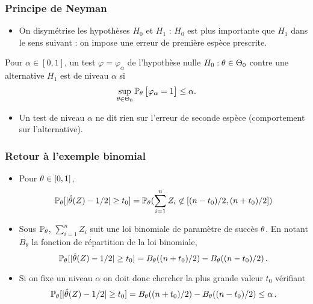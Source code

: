 \begin{frame}
\frametitle{Principe de Neyman}
\begin{itemize}
\item
On  \alert{disymétrise}  les hypothèses $H_0$ et $H_1$
: $H_0$ est  plus importante  que $H_1$ dans le sens suivant : on \alert{ impose} une \alert{erreur de première espèce prescrite}.
\end{itemize}
\begin{df}
Pour $\alpha \in [0,1]$, un test $\varphi = \varphi_\alpha$ de l'hypothèse nulle $H_0:\theta \in \Theta_0$ contre une alternative $H_1$ est de niveau $\alpha$ si
$$\sup_{\theta \in \Theta_0}\operatorname{{\mathbb P}}_\theta\big[\varphi_\alpha = 1\big] \leq \alpha.$$
\end{df}
\begin{itemize}
\item Un test de niveau $\alpha$ ne dit \alert{rien} sur l'erreur de seconde espèce (comportement sur l'alternative).
\end{itemize}
\end{frame}

\begin{frame}
\frametitle{Retour à l'exemple binomial}
\begin{itemize}
\item Pour $\theta \in [0,1]$, 
$$
\operatorname{{\mathbb P}}_\theta[ |\hat{\theta}(Z) - 1/2| \geq t_0 ] = \operatorname{{\mathbb P}}_{\theta}(\sum_{i=1}^n Z_i \not \in \left[(n-t_0)/2,(n+t_0)/2\right])
$$
\item Sous $\operatorname{{\mathbb P}}_\theta$, $\sum_{i=1}^n Z_i$ suit une loi binomiale de paramètre de succès $\theta$. En notant $B_\theta$ la fonction
de répartition de la loi binomiale,
$$
\operatorname{{\mathbb P}}_\theta[ |\hat{\theta}(Z) - 1/2| \geq t_0 ] = B_\theta((n+t_0)/2) - B_\theta((n-t_0)/2) \,.
$$
\item Si on fixe un niveau $\alpha$ on doit donc chercher la plus grande valeur $t_0$ vérifiant 
$$
\operatorname{{\mathbb P}}_\theta[ |\hat{\theta}(Z) - 1/2| \geq t_0 ] = B_\theta((n+t_0)/2) - B_\theta((n-t_0)/2) \leq \alpha \,.
$$
\end{itemize}
\end{frame}

